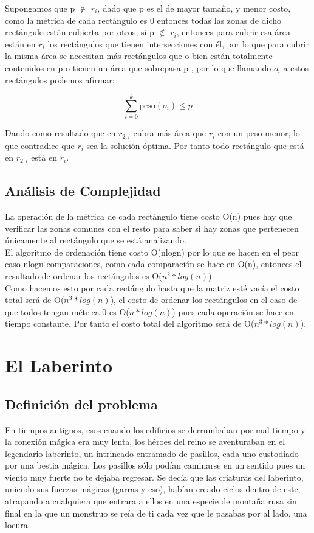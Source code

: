 \documentclass{article}
\begin{document}
Supongamos que p $\notin$ $r_i$, dado que p es el de mayor tamaño, y menor costo, como la métrica de cada rectángulo es 0 entonces todas las zonas de dicho rectángulo están cubierta por otros, si p $\notin$ $r_i$, entonces para cubrir esa área están en $r_i$ los rectángulos que tienen intersecciones con él, por lo que para cubrir la misma área se necesitan más rectángulos que o bien están totalmente contenidos en p o tienen un área que sobrepasa p , por lo que llamando $o_i$ a estos rectángulos podemos afirmar:

\begin{equation}
\sum_{i=0}^{k} \text{peso}(o_i) \leq p
\end{equation}

Dando como resultado que en $r_{2,i}$ cubra más área que $r_i$ con un peso menor, lo que contradice que $r_i$ sea la solución óptima. Por tanto todo rectángulo que está en $r_{2,i} $ está en $r_i$.

\subsection{Análisis de Complejidad}
    La operación de la métrica de cada rectángulo tiene costo O(n) pues hay que verificar las zonas comunes con el resto para saber si hay zonas que pertenecen únicamente al rectángulo que se está analizando.\\

    El algoritmo de ordenación tiene costo O(nlogn) por lo que se hacen en el peor caso nlogn comparaciones, como cada comparación se hace en O(n), entonces el resultado de ordenar los rectángulos es O($n^2 * log(n)$)\\

    Como hacemos esto por cada rectángulo hasta que la matriz esté vacía el costo total será de O($n^3 * log(n)$), el costo de ordenar los rectángulos en el caso de que todos tengan métrica 0 es O($n*log(n)$) pues cada operación se hace en tiempo constante. Por tanto el costo total del algoritmo será de O($n^3 * log(n)$).

\section{El Laberinto}
	\subsection{Definición del problema}
	En tiempos antiguos, esos cuando los edificios se derrumbaban por mal tiempo y la conexión mágica era muy lenta, los héroes del reino se aventuraban en el legendario laberinto, un intrincado entramado de pasillos, cada uno custodiado por una bestia mágica. Los pasillos sólo podían caminarse en un sentido pues un viento muy fuerte no te dejaba regresar. Se decía que las criaturas del laberinto, uniendo sus fuerzas mágicas (garras y eso), habían creado ciclos dentro de este, atrapando a cualquiera que entrara a ellos en una especie de montaña rusa sin final en la que un monstruo se reía de ti cada vez que le pasabas por al lado, una locura.
\end{document}
